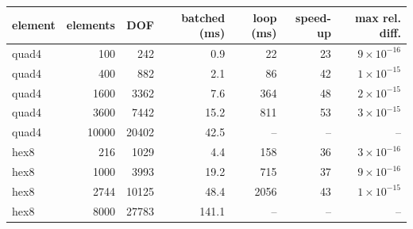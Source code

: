 \begin{tabular}{lrrrrrr}
\toprule
element & elements & DOF & batched (ms) & loop (ms) & speed-up & max rel. diff. \\
\midrule
quad4 & 100 & 242 & 0.9 & 22 & 23 & $9\times10^{-16}$ \\
quad4 & 400 & 882 & 2.1 & 86 & 42 & $1\times10^{-15}$ \\
quad4 & 1600 & 3362 & 7.6 & 364 & 48 & $2\times10^{-15}$ \\
quad4 & 3600 & 7442 & 15.2 & 811 & 53 & $3\times10^{-15}$ \\
quad4 & 10000 & 20402 & 42.5 & -- & -- & -- \\
hex8 & 216 & 1029 & 4.4 & 158 & 36 & $3\times10^{-16}$ \\
hex8 & 1000 & 3993 & 19.2 & 715 & 37 & $9\times10^{-16}$ \\
hex8 & 2744 & 10125 & 48.4 & 2056 & 43 & $1\times10^{-15}$ \\
hex8 & 8000 & 27783 & 141.1 & -- & -- & -- \\
\bottomrule
\end{tabular}
